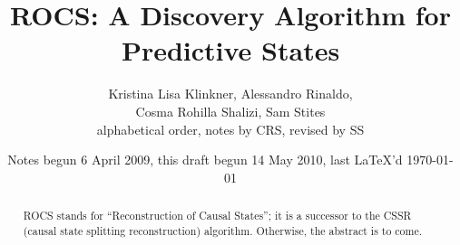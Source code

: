 \documentclass{article}
\begin{document}
\title{ROCS: A Discovery Algorithm for Predictive States}
\author{Kristina Lisa Klinkner, Alessandro Rinaldo,\\
  Cosma Rohilla Shalizi, Sam Stites\\
{\small alphabetical order, notes by CRS, revised by SS}}
\date{Notes begun 6 April 2009, this draft begun 14 May 2010, last \LaTeX 'd \today}
\maketitle
\begin{abstract}
  ROCS stands for ``Reconstruction of Causal States''; it is a successor to the
  CSSR (causal state splitting reconstruction) algorithm.  Otherwise, the
  abstract is to come.
\end{abstract}

\tableofcontents
















\appendix


\end{document}
